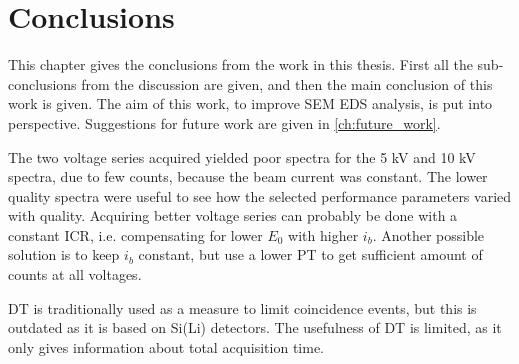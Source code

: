 \chapter{Conclusions}
\label{ch:conclusion}

This chapter gives the conclusions from the work in this thesis. 
First all the sub-conclusions from the discussion are given, and then the main conclusion of this work is given.
The aim of this work, to improve SEM EDS analysis, is put into perspective.
Suggestions for future work are given in \cref{ch:future_work}.











The two voltage series acquired yielded poor spectra for the 5 kV and 10 kV spectra, due to few counts, because the beam current was constant.
The lower quality spectra were useful to see how the selected performance parameters varied with quality.
Acquiring better voltage series can probably be done with a constant ICR, i.e. compensating for lower $E_0$ with higher $i_b$.
Another possible solution is to keep $i_b$ constant, but use a lower PT to get sufficient amount of counts at all voltages.

DT is traditionally used as a measure to limit coincidence events, but this is outdated as it is based on Si(Li) detectors.
The usefulness of DT is limited, as it only gives information about total acquisition time.

